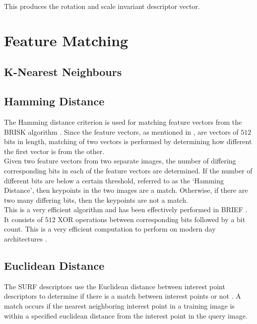 \documentclass{article}
\begin{document}
This produces the rotation and scale invariant descriptor vector.\\ 

\section{Feature Matching}
\label{sec:matching}

\subsection{K-Nearest Neighbours}
\label{sec:knn}

\subsection{Hamming Distance}
\label{sec:hamming}
The Hamming distance criterion is used for matching feature vectors from the BRISK algorithm \cite{Leutenegger2011}. Since the feature vectors, as mentioned in , are vectors of $512$ bits in length, matching of two vectors is performed by determining how different the first vector is from the other.\\

Given two feature vectors from two separate images, the number of differing corresponding bits in each of the feature vectors are determined. If the number of different bits are below a certain threshold, referred to as the `Hamming Distance', then keypoints in the two images are a match. Otherwise, if there are two many differing bits, then the keypoints are not a match.\\

This is a very efficient algorithm and has been effectively performed in BRIEF \cite{Calonder}. It consists of $512$ XOR operations between corresponding bits followed by a bit count. This is a very efficient computation to perform on modern day architectures \cite{Leutenegger2011}. \\ 

\subsection{Euclidean Distance}
\label{sec:euclidean}
The SURF descriptors use the Euclidean distance between interest point descriptors to determine if there is a match between interest points or not \cite{Lowe2004}. A match occurs if the nearest neighboring interest point in a training image is within a specified euclidean distance from the interest point in the query image.\\
\end{document}
